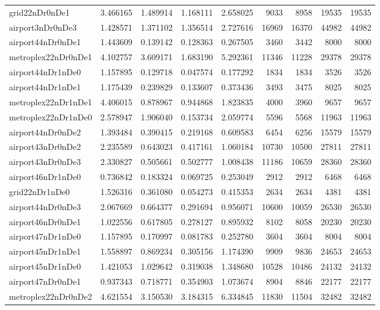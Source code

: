 \begin{longtable}{|l|r|r|r|r|r|r|r|r|}
grid22nDr0nDe1 & 3.466165 & 1.489914 & 1.168111 & 2.658025 & 9033 & 8958 & 19535 & 19535 \\
airport3nDr0nDe3 & 1.428571 & 1.371102 & 1.356514 & 2.727616 & 16969 & 16370 & 44982 & 44982 \\
airport44nDr0nDe1 & 1.443609 & 0.139142 & 0.128363 & 0.267505 & 3460 & 3442 & 8000 & 8000 \\
metroplex22nDr0nDe1 & 4.102757 & 3.609171 & 1.683190 & 5.292361 & 11346 & 11228 & 29378 & 29378 \\
airport44nDr1nDe0 & 1.157895 & 0.129718 & 0.047574 & 0.177292 & 1834 & 1834 & 3526 & 3526 \\
airport44nDr1nDe1 & 1.175439 & 0.239829 & 0.133607 & 0.373436 & 3493 & 3475 & 8025 & 8025 \\
metroplex22nDr1nDe1 & 4.406015 & 0.878967 & 0.944868 & 1.823835 & 4000 & 3960 & 9657 & 9657 \\
metroplex22nDr1nDe0 & 2.578947 & 1.906040 & 0.153734 & 2.059774 & 5596 & 5568 & 11963 & 11963 \\
airport44nDr0nDe2 & 1.393484 & 0.390415 & 0.219168 & 0.609583 & 6454 & 6256 & 15579 & 15579 \\
airport43nDr0nDe2 & 2.235589 & 0.643023 & 0.417161 & 1.060184 & 10730 & 10500 & 27811 & 27811 \\
airport43nDr0nDe3 & 2.330827 & 0.505661 & 0.502777 & 1.008438 & 11186 & 10659 & 28360 & 28360 \\
airport46nDr1nDe0 & 0.736842 & 0.183324 & 0.069725 & 0.253049 & 2912 & 2912 & 6468 & 6468 \\
grid22nDr1nDe0 & 1.526316 & 0.361080 & 0.054273 & 0.415353 & 2634 & 2634 & 4381 & 4381 \\
airport44nDr0nDe3 & 2.067669 & 0.664377 & 0.291694 & 0.956071 & 10600 & 10059 & 26530 & 26530 \\
airport46nDr0nDe1 & 1.022556 & 0.617805 & 0.278127 & 0.895932 & 8102 & 8058 & 20230 & 20230 \\
airport47nDr1nDe0 & 1.157895 & 0.170997 & 0.081783 & 0.252780 & 3604 & 3604 & 8004 & 8004 \\
airport45nDr1nDe1 & 1.558897 & 0.869234 & 0.305156 & 1.174390 & 9909 & 9836 & 24653 & 24653 \\
airport45nDr1nDe0 & 1.421053 & 1.029642 & 0.319038 & 1.348680 & 10528 & 10486 & 24132 & 24132 \\
airport47nDr0nDe1 & 0.937343 & 0.718771 & 0.354903 & 1.073674 & 8904 & 8846 & 22177 & 22177 \\
metroplex22nDr0nDe2 & 4.621554 & 3.150530 & 3.184315 & 6.334845 & 11830 & 11504 & 32482 & 32482 \\

\end{longtable}
